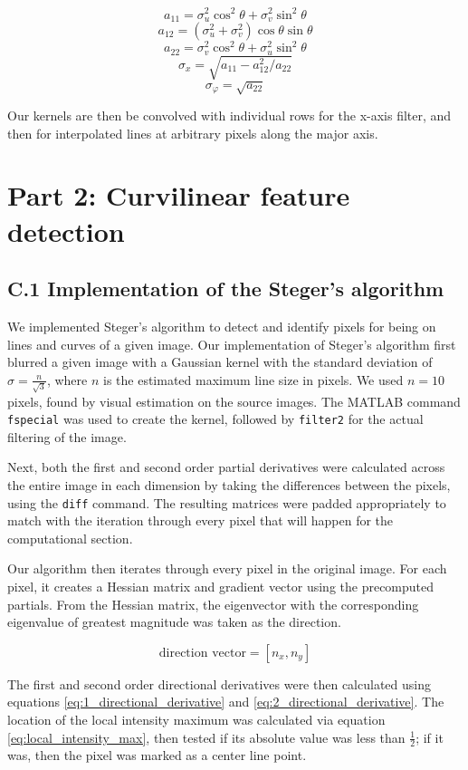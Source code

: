 \documentclass{article}
\begin{document}
\[ a_{11} = \sigma_u^2 \cos^2 \theta + \sigma_v^2 \sin^2 \theta \]
\[ a_{12} = (\sigma_u^2 + \sigma_v^2)\cos\theta \sin\theta \]
\[ a_{22} = \sigma_v^2 \cos^2 \theta + \sigma_u^2 \sin^2 \theta \]
\[ \sigma_x = \sqrt{a_{11} - a_{12}^2/a_{22}} \]
\[ \sigma_\varphi = \sqrt{a_{22}} \]

Our kernels are then be convolved with individual rows for the x-axis filter, and then for interpolated lines at arbitrary pixels along the major axis.


\pagebreak
\section*{Part 2: Curvilinear feature detection}

\subsection*{C.1 Implementation of the Steger's algorithm}

We implemented Steger's algorithm to detect and identify pixels for being on lines and curves of a given image. Our implementation of Steger's algorithm first blurred a given image with a Gaussian kernel with the standard deviation of $\sigma = \frac{n}{\sqrt{3}}$, where $n$ is the estimated maximum line size in pixels. We used $n = 10$ pixels, found by visual estimation on the source images. The MATLAB command \texttt{fspecial} was used to create the kernel, followed by \texttt{filter2} for the actual filtering of the image.

Next, both the first and second order partial derivatives were calculated across the entire image in each dimension by taking the differences between the pixels, using the \texttt{diff} command. The resulting matrices were padded appropriately to match with the iteration through every pixel that will happen for the computational section.

Our algorithm then iterates through every pixel in the original image. For each pixel, it creates a Hessian matrix and gradient vector using the precomputed partials. From the Hessian matrix, the eigenvector with the corresponding eigenvalue of greatest magnitude was taken as the direction.

\begin{equation}
\text{direction vector} = [n_x, n_y]
\label{eq:direction}
\end{equation}

The first and second order directional derivatives were then calculated using equations \ref{eq:1_directional_derivative} and \ref{eq:2_directional_derivative}. The location of the local intensity maximum was calculated via equation \ref{eq:local_intensity_max}, then tested if its absolute value was less than $\frac{1}{2}$; if it was, then the pixel was marked as a center line point.
\end{document}
